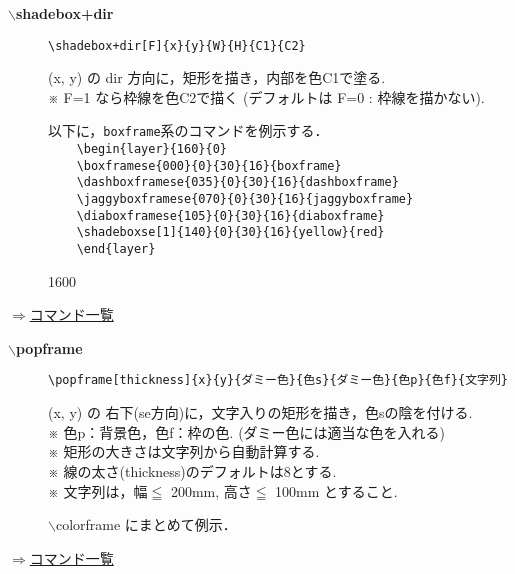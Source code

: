 \documentclass[a4j,12pt,dvipdfmx]{ujarticle}
\newcommand{\bs}{$\backslash$}
\newenvironment{cmd}[2]{%
\hypertarget{#2}{}
\begin{center}{\bf\large #1}\end{center}
\begin{description}
}{
\end{description}
\begin{flushright} \hyperlink{functionlist}{$\Rightarrow$コマンド一覧}\end{flushright}
}
\newcommand{\itemketj}[1]{
\item[\Ltab{15mm}{#1}]
}
\newcommand{\Chuu}[1][6.7mm]{%
\Ltab{#1}{}※ %
}
\begin{document}
\begin{cmd}{\bs shadebox+dir}{shadebox}
\itemketj{使用法}\verb|\shadebox+dir[F]{x}{y}{W}{H}{C1}{C2}|
\itemketj{説明}(x, y) の dir 方向に，矩形を描き，内部を色C1で塗る.\\
\Chuu F=1 なら枠線を色C2で描く (デフォルトは F=0 : 枠線を描かない).


\vspace{\baselineskip}
以下に，\verb|boxframe|系のコマンドを例示する．\\
\verb|    \begin{layer}{160}{0}|\\
\verb|    \boxframese{000}{0}{30}{16}{boxframe}|\\
\verb|    \dashboxframese{035}{0}{30}{16}{dashboxframe}|\\
\verb|    \jaggyboxframese{070}{0}{30}{16}{jaggyboxframe}|\\
\verb|    \diaboxframese{105}{0}{30}{16}{diaboxframe}|\\
\verb|    \shadeboxse[1]{140}{0}{30}{16}{yellow}{red}|\\
\verb|    \end{layer}|

\vspace{\baselineskip}
\begin{layer}{160}{0}
\end{layer}

\vspace{15mm}
\end{cmd}
\begin{cmd}{\bs popframe}{popframe}
\itemketj{使用法}\verb|\popframe[thickness]{x}{y}{ダミー色}{色s}{ダミー色}{色p}{色f}{文字列}|
\itemketj{説明}(x, y) の 右下(se方向)に，文字入りの矩形を描き，色sの陰を付ける. \\
\Chuu 色p：背景色，色f：枠の色.
(ダミー色には適当な色を入れる)\\
\Chuu 矩形の大きさは文字列から自動計算する.\\
\Chuu 線の太さ(thickness)のデフォルトは8とする.\\
\Chuu 文字列は，幅$\leqq$ 200mm, 高さ$\leqq$ 100mm とすること.
\itemketj{例}{\bs colorframe} にまとめて例示．
\end{cmd}
\end{document}
